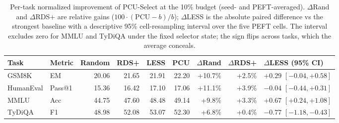 \begin{table}[t]
\centering
\small
\setlength{\tabcolsep}{5pt}
\caption{Per-task normalized improvement of PCU-Select at the 10\% budget (seed- and PEFT-averaged). $\Delta$Rand and $\Delta$RDS+ are relative gains ($100\cdot(\mathrm{PCU}-b)/b$); $\Delta$LESS is the absolute paired difference vs the strongest baseline with a descriptive 95\% cell-resampling interval over the five PEFT cells. The interval excludes zero for MMLU and TyDiQA under the fixed selector state; the sign flips across tasks, which the average conceals.}
\label{tab:per-task-normalized}
\begin{tabular}{llrrrrrrl}
\toprule
Task & Metric & Random & RDS+ & LESS & PCU & $\Delta$Rand & $\Delta$RDS+ & $\Delta$LESS (95\% CI) \\
\midrule
GSM8K & EM & 20.06 & 21.65 & 21.91 & 22.20 & +10.7\% & +2.5\% & $+0.29$ $[-0.04, +0.58]$ \\
HumanEval & Pass@1 & 15.36 & 16.42 & 17.10 & 17.06 & +11.1\% & +3.9\% & $-0.04$ $[-0.44, +0.31]$ \\
MMLU & Acc & 44.75 & 47.60 & 48.48 & 49.14 & +9.8\% & +3.3\% & $+0.67$ $[+0.24, +1.08]$ \\
TyDiQA & F1 & 48.98 & 52.08 & 53.07 & 52.30 & +6.8\% & +0.4\% & $-0.77$ $[-1.18, -0.43]$ \\
\bottomrule
\end{tabular}
\end{table}
